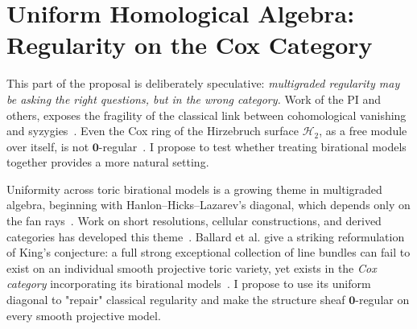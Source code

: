 \documentclass[11pt,reqno]{amsart}
\theoremstyle{remark}
\newcommand{\zero}{\mathbf{0}}
\newcommand{\cH}{\mathcal{H}}
\begin{document}
%
%

\section{Uniform Homological Algebra: Regularity on the Cox Category}
\label{sec:uniform-homological-algebra-on-toric}

This part of the proposal is deliberately speculative: \emph{multigraded regularity may be asking the right questions, but in the wrong category.} Work of the PI and others, exposes the fragility of the classical link between cohomological vanishing and syzygies~\cite{maclaganSmith04,bruceHellerSayrafi26,bruceHellerSayrafi22}. Even the Cox ring of the Hirzebruch surface $\cH_2$, as a free module over itself, is not $\zero$-regular~\cite[Example~4.3]{maclaganSmith04}. I propose to test whether treating birational models together provides a more natural setting.

Uniformity across toric birational models is a growing theme in multigraded algebra, beginning with Hanlon--Hicks--Lazarev's diagonal, which depends only on the fan rays~\cite{HHL24}. Work on short resolutions, cellular constructions, and derived categories has developed this theme~\cite{brownErman24-1,faveroHuang23,faveroHuang25,faveroSapronov24,CH25,borisovHan25,berkeschHellerSmithYang25,han26}. Ballard et al. give a striking reformulation of King's conjecture: a full strong exceptional collection of line bundles can fail to exist on an individual smooth projective toric variety, yet exists in the \emph{Cox category} incorporating its birational models~\cite{longLiveKing}. I propose to use its uniform diagonal to "repair" classical regularity and make the structure sheaf $\zero$-regular on every smooth projective model.
\end{document}
